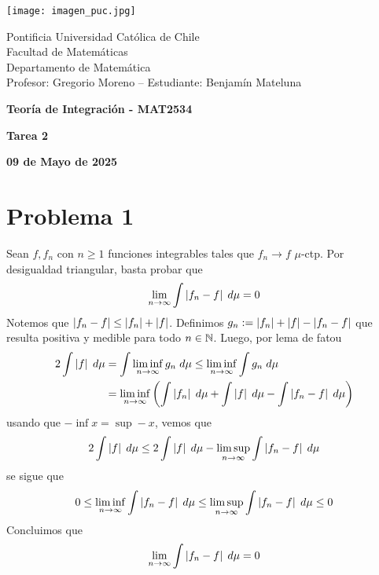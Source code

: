 \documentclass{article}
\begin{document}
\begin{minipage}{2.5cm}
    \texttt{[image: imagen\_puc.jpg]}
\end{minipage}
\begin{minipage}{14cm}
    {\sc Pontificia Universidad Católica de Chile\\
    Facultad de Matemáticas\\
    Departamento de Matemática\\
    Profesor: Gregorio Moreno -- Estudiante: Benjamín Mateluna}
\end{minipage}
\vspace{1ex}

{\centerline{\bf Teoría de Integración - MAT2534}
\centerline{\bf Tarea 2}}
\centerline{\bf 09 de Mayo de 2025}

\section*{Problema 1}
\noindent Sean $f,f_{n}$ con $n\geq1$ funciones integrables tales que $f_{n}\to f$ $\mu$-ctp. Por 
desigualdad triangular, basta probar que
\begin{equation*}
    \lim\limits_{n\to\infty}\int\left|f_{n}-f \right|\hspace{1mm}d\mu=0
\end{equation*}
Notemos que $\left|f_{n}-f \right|\leq\left|f_{n} \right|+\left|f \right|$. Definimos $g_{n}:=\left|f_{n} \right|+\left|f \right|-
\left|f_{n}-f \right|$ que resulta positiva y medible para todo $n\in\mathbb{N}$. Luego, por lema de fatou
\begin{align*}
    2\int\left|f \right|\hspace{1mm}d\mu &= \int\liminf\limits_{n\to\infty}g_{n}\hspace{1mm}d\mu
    \leq\liminf\limits_{n\to\infty}\int g_{n}\hspace{1mm}d\mu \\
    &=\liminf\limits_{n\to\infty}\left(\int\left|f_{n} \right|\hspace{1mm}d\mu+\int\left|f \right|\hspace{1mm}d\mu
    -\int\left|f_{n}-f \right|\hspace{1mm}d\mu\right)
\end{align*}
usando que $-\inf x=\sup -x$, vemos que
\begin{equation*}
    2\int\left|f \right|\hspace{1mm}d\mu\leq2\int\left|f \right|\hspace{1mm}d\mu-
    \limsup\limits_{n\to\infty}\int\left|f_{n}-f \right|\hspace{1mm}d\mu
\end{equation*}
se sigue que
\begin{equation*}
    0\leq\liminf\limits_{n\to\infty}\int\left|f_{n}-f \right|\hspace{1mm}d\mu
    \leq\limsup\limits_{n\to\infty}\int\left|f_{n}-f \right|\hspace{1mm}d\mu\leq0
\end{equation*}
Concluimos que
\begin{equation*}
    \lim\limits_{n\to\infty}\int\left|f_{n}-f \right|\hspace{1mm}d\mu=0
\end{equation*}
\end{document}

